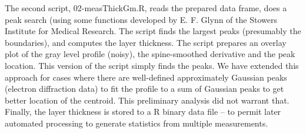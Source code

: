 The second script, 02-measThickGm.R, reads the prepared
data frame, does a peak search (using some functions developed
by E. F. Glynn of the Stowers Institute for Medical Research.
The script finds the largest peaks (presumably the boundaries),
and computes the layer thickness. The script prepares an overlay
plot of the gray level profile (noisy), the spine-smoothed derivative
and the peak location. This version of the script simply finds
the peaks. We have extended this approach for cases where there
are well-defined approximately Gaussian peaks (electron diffraction
data) to fit the profile to a sum of Gaussian peaks to get better location
of the centroid. This preliminary analysis did not warrant that.
Finally, the layer thickness is stored to a R binary data file -- to
permit later automated processing to generate statistics from multiple
measurements.

\endinput
